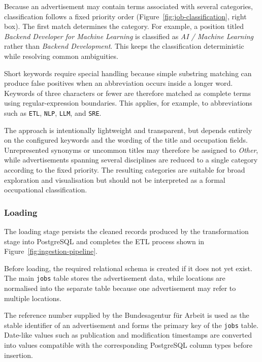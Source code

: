 \documentclass[11pt,a4paper]{article}
\begin{document}
Because an advertisement may contain terms associated with several categories, classification follows a fixed priority order (Figure~\ref{fig:job-classification}, right box). The first match determines the category. For example, a position titled \textit{Backend Developer for Machine Learning} is classified as \textit{AI / Machine Learning} rather than \textit{Backend Development}. This keeps the classification deterministic while resolving common ambiguities.

Short keywords require special handling because simple substring matching can produce false positives when an abbreviation occurs inside a longer word. Keywords of three characters or fewer are therefore matched as complete terms using regular-expression boundaries. This applies, for example, to abbreviations such as \texttt{ETL}, \texttt{NLP}, \texttt{LLM}, and \texttt{SRE}.

The approach is intentionally lightweight and transparent, but depends entirely on the configured keywords and the wording of the title and occupation fields. Unrepresented synonyms or uncommon titles may therefore be assigned to \textit{Other}, while advertisements spanning several disciplines are reduced to a single category according to the fixed priority. The resulting categories are suitable for broad exploration and visualisation but should not be interpreted as a formal occupational classification.


\subsubsection{Loading \label{sec:loading}}

The loading stage persists the cleaned records produced by the transformation stage into PostgreSQL and completes the ETL process shown in Figure~\ref{fig:ingestion-pipeline}.

Before loading, the required relational schema is created if it does not yet exist. The main \texttt{jobs} table stores the advertisement data, while locations are normalised into the separate  table because one advertisement may refer to multiple locations.

The reference number supplied by the Bundesagentur für Arbeit is used as the stable identifier of an advertisement and forms the primary key of the \texttt{jobs} table. Date-like values such as publication and modification timestamps are converted into values compatible with the corresponding PostgreSQL column types before insertion.
\end{document}
